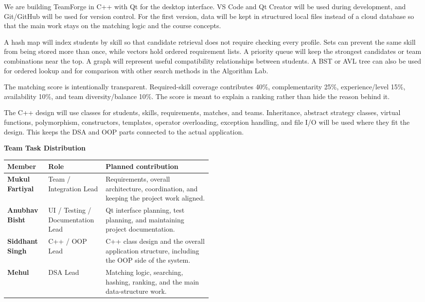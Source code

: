 \documentclass[a4paper,11pt]{article}
\newcommand{\SubHeading}[1]{\needspace{3\baselineskip}{\color{GEUBlue}\fontsize{15.5}{18}\selectfont #1\par}\vspace{1pt}}
\begin{document}
\begin{answerbox}
We are building TeamForge in C++ with Qt for the desktop interface. VS Code and Qt Creator will be used during development, and Git/GitHub will be used for version control. For the first version, data will be kept in structured local files instead of a cloud database so that the main work stays on the matching logic and the course concepts.

A hash map will index students by skill so that candidate retrieval does not require checking every profile. Sets can prevent the same skill from being stored more than once, while vectors hold ordered requirement lists. A priority queue will keep the strongest candidates or team combinations near the top. A graph will represent useful compatibility relationships between students. A BST or AVL tree can also be used for ordered lookup and for comparison with other search methods in the Algorithm Lab.

The matching score is intentionally transparent. Required-skill coverage contributes 40\%, complementarity 25\%, experience/level 15\%, availability 10\%, and team diversity/balance 10\%. The score is meant to explain a ranking rather than hide the reason behind it.

The C++ design will use classes for students, skills, requirements, matches, and teams. Inheritance, abstract strategy classes, virtual functions, polymorphism, constructors, templates, operator overloading, exception handling, and file I/O will be used where they fit the design. This keeps the DSA and OOP parts connected to the actual application.
\end{answerbox}
\clearpage

\SubHeading{Project Approach (continued)}
\begin{answerbox}
\textbf{Team Task Distribution}

\vspace{3pt}
\begin{tabularx}{\linewidth}{|>{\bfseries}p{0.20\linewidth}|p{0.29\linewidth}|X|}
\hline
Member & Role & Planned contribution \\
\hline
Mukul Fartiyal & Team / Integration Lead & Requirements, overall architecture, coordination, and keeping the project work aligned. \\
\hline
Anubhav Bisht & UI / Testing / Documentation Lead & Qt interface planning, test planning, and maintaining project documentation. \\
\hline
Siddhant Singh & C++ / OOP Lead & C++ class design and the overall application structure, including the OOP side of the system. \\
\hline
Mehul & DSA Lead & Matching logic, searching, hashing, ranking, and the main data-structure work. \\
\hline
\end{tabularx}
\end{answerbox}
\end{document}
